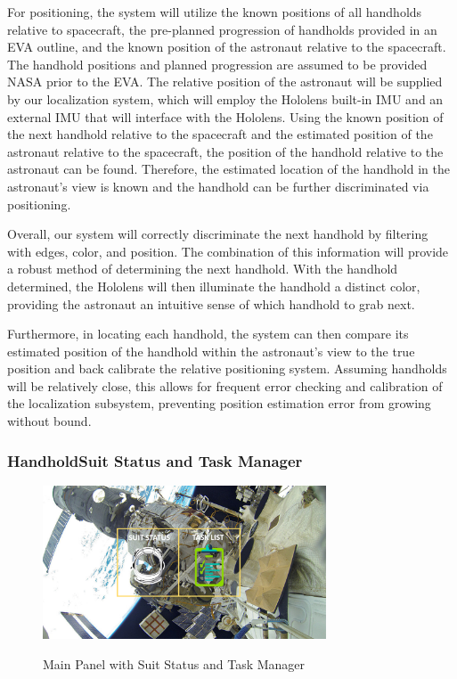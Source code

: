 \documentclass{article}
\let\Oldsubsubsection\subsubsection
\renewcommand{\subsubsection}{\FloatBarrier\Oldsubsubsection}
\begin{document}
For positioning, the system will utilize the known positions of all handholds relative to spacecraft, the pre-planned progression of handholds provided in an EVA outline, and the known position of the astronaut relative to the spacecraft. The handhold positions and planned progression are assumed to be provided NASA prior to the EVA. The relative position of the astronaut will be supplied by our localization system, which will employ the Hololens built-in IMU and an external IMU that will interface with the Hololens. Using the known position of the next handhold relative to the spacecraft and the estimated position of the astronaut relative to the spacecraft, the position of the handhold relative to the astronaut can be found. Therefore, the estimated location of the handhold in the astronaut’s view is known and the handhold can be further discriminated via positioning.

Overall, our system will correctly discriminate the next handhold by filtering with edges, color, and position. The combination of this information will provide a robust method of determining the next handhold. With the handhold determined, the Hololens will then illuminate the handhold a distinct color, providing the astronaut an intuitive sense of which handhold to grab next.

Furthermore, in locating each handhold, the system can then compare its estimated position of the handhold within the astronaut’s view to the true position and back calibrate the relative positioning system. Assuming handholds will be relatively close, this allows for frequent error checking and calibration of the localization subsystem, preventing position estimation error from growing without bound.

\subsubsection{HandholdSuit Status and Task Manager}

\begin{figure}[!htb]
  \centering
  \caption{Main Panel with Suit Status and Task Manager}
  \includegraphics[width=0.75\textwidth]{assets/suitdatatasklist.png}
  \label{fig:suitdatatasklist}
\end{figure}
\end{document}
